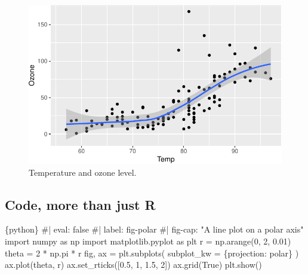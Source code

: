 \documentclass[
  letterpaper,
  DIV=11,
  numbers=noendperiod]{scrartcl}
\newenvironment{Shaded}{\begin{snugshade}}{\end{snugshade}}
\newcommand{\CommentTok}[1]{\textcolor[rgb]{0.37,0.37,0.37}{#1}}
\newcommand{\DecValTok}[1]{\textcolor[rgb]{0.68,0.00,0.00}{#1}}
\newcommand{\FloatTok}[1]{\textcolor[rgb]{0.68,0.00,0.00}{#1}}
\newcommand{\ImportTok}[1]{\textcolor[rgb]{0.00,0.46,0.62}{#1}}
\newcommand{\InformationTok}[1]{\textcolor[rgb]{0.37,0.37,0.37}{#1}}
\newcommand{\NormalTok}[1]{\textcolor[rgb]{0.00,0.23,0.31}{#1}}
\newcommand{\OperatorTok}[1]{\textcolor[rgb]{0.37,0.37,0.37}{#1}}
\newcommand{\StringTok}[1]{\textcolor[rgb]{0.13,0.47,0.30}{#1}}
\newcommand{\VariableTok}[1]{\textcolor[rgb]{0.07,0.07,0.07}{#1}}
\begin{document}
\begin{figure}[H]

{\centering \includegraphics{slides_files/figure-pdf/fig-airquality-1.pdf}

}

\caption{\label{fig-airquality}Temperature and ozone level.}

\end{figure}

\hypertarget{code-more-than-just-r}{%
\subsection{Code, more than just R}\label{code-more-than-just-r}}

\begin{Shaded}
\begin{Highlighting}[]
\InformationTok{\textasciigrave{}\textasciigrave{}\textasciigrave{}\{python\}}
\CommentTok{\#| eval: false}
\CommentTok{\#| label: fig{-}polar}
\CommentTok{\#| fig{-}cap: "A line plot on a polar axis"}
\ImportTok{import}\NormalTok{ numpy }\ImportTok{as}\NormalTok{ np}
\ImportTok{import}\NormalTok{ matplotlib.pyplot }\ImportTok{as}\NormalTok{ plt}
\NormalTok{r }\OperatorTok{=}\NormalTok{ np.arange(}\DecValTok{0}\NormalTok{, }\DecValTok{2}\NormalTok{, }\FloatTok{0.01}\NormalTok{)}
\NormalTok{theta }\OperatorTok{=} \DecValTok{2} \OperatorTok{*}\NormalTok{ np.pi }\OperatorTok{*}\NormalTok{ r}
\NormalTok{fig, ax }\OperatorTok{=}\NormalTok{ plt.subplots(}
\NormalTok{  subplot\_kw }\OperatorTok{=}\NormalTok{ \{}\StringTok{\textquotesingle{}projection\textquotesingle{}}\NormalTok{: }\StringTok{\textquotesingle{}polar\textquotesingle{}}\NormalTok{\} }
\NormalTok{)}
\NormalTok{ax.plot(theta, r)}
\NormalTok{ax.set\_rticks([}\FloatTok{0.5}\NormalTok{, }\DecValTok{1}\NormalTok{, }\FloatTok{1.5}\NormalTok{, }\DecValTok{2}\NormalTok{])}
\NormalTok{ax.grid(}\VariableTok{True}\NormalTok{)}
\NormalTok{plt.show()}
\InformationTok{\textasciigrave{}\textasciigrave{}\textasciigrave{}}
\end{Highlighting}
\end{Shaded}
\end{document}
